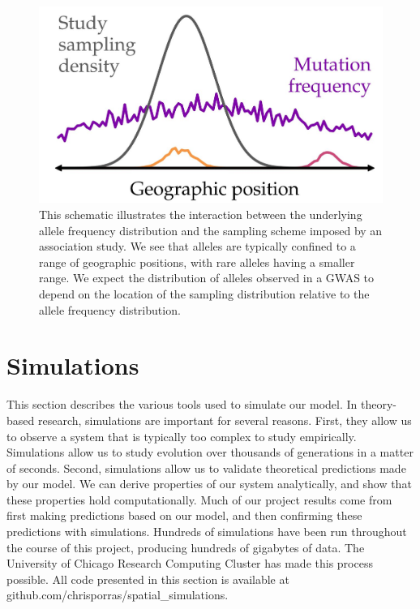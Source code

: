 \begin{figure}[H]
    \centering
    \includegraphics[scale=0.35]{img/smapling_schematic.JPG}
    \caption{This schematic illustrates the interaction between the underlying allele frequency distribution and the sampling scheme imposed by an association study. We see that alleles are typically confined to a range of geographic positions, with rare alleles having a smaller range. We expect the distribution of alleles observed in a GWAS to depend on the location of the sampling distribution relative to the allele frequency distribution.}
    \label{fig:sampling_schematic}
\end{figure}

\newpage
\section{Simulations}

This section describes the various tools used to simulate our model. In theory-based research, simulations are important for several reasons. First, they allow us to observe a system that is typically too complex to study empirically. Simulations allow us to study evolution over thousands of generations in a matter of seconds. Second, simulations allow us to validate theoretical predictions made by our model. We can derive properties of our system analytically, and show that these properties hold computationally. Much of our project results come from first making predictions based on our model, and then confirming these predictions with simulations. Hundreds of simulations have been run throughout the course of this project, producing hundreds of gigabytes of data. The University of Chicago Research Computing Cluster has made this process possible. All code presented in this section is available at github.com/chrisporras/spatial\_simulations. 


